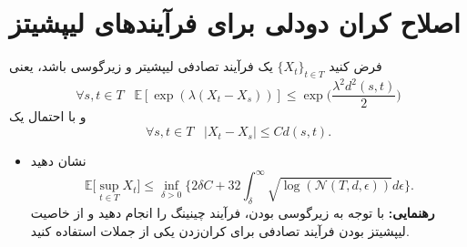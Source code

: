 
\section{اصلاح کران دودلی برای فرآیند‌های لیپشیتز}
فرض کنید 
$\{X_t\}_{t\in T}$
یک فرآیند تصادفی لیپشیتر و زیرگوسی باشد، یعنی
$$\forall s, t \in T \;\;\; \mathbb{E}[\exp(\lambda(X_t - X_s))] \leq \exp\Big(\frac{\lambda^2 d^2(s, t)}{2}\Big)$$
و با احتمال یک
$$\forall s, t \in T \;\;\;  |X_t - X_s| \leq Cd(s, t).$$

\begin{itemize}
	\item
	نشان دهید 
	$$\mathbb{E}\big[\sup_{t\in T} X_t\big] \leq \inf_{\delta > 0} \Big\{2\delta C + 32 \int_{\delta}^{\infty} \sqrt{\log(\mathcal{N}(T, d, \epsilon))} d\epsilon\Big\}.$$
	\textbf{رهنمایی:  }
	با توجه به زیرگوسی بودن، فرآیند چینینگ را انجام دهید و از خاصیت لیپشیتز بودن فرآیند تصادفی برای کران‌زدن یکی از جملات استفاده کنید.
\end{itemize}
